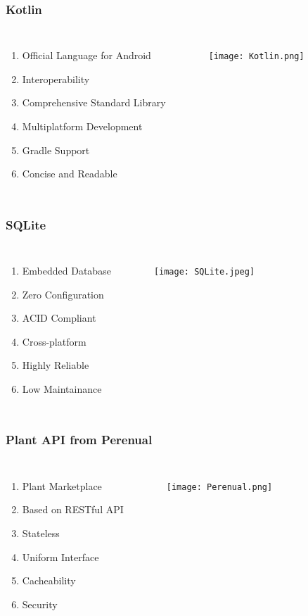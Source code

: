 \documentclass[xcolor=table]{beamer}
\begin{document}
\begin{frame}[fragile]
\frametitle{Kotlin}
\begin{columns}
   \begin{enumerate}
    \item Official Language for Android
    \item Interoperability
    \item Comprehensive Standard Library
    \item Multiplatform Development
    \item Gradle Support
    \item Concise and Readable
  \end{enumerate}
    \begin{figure}[H]
    \texttt{[image: Kotlin.png]}
    \end{figure}
    \end{columns}
\end{frame}

\begin{frame}[fragile]
\frametitle{SQLite}
\begin{columns}
   \begin{enumerate}
    \item Embedded Database
    \item Zero Configuration
    \item ACID Compliant
    \item Cross-platform
    \item Highly Reliable
    \item Low Maintainance
  \end{enumerate}
    \begin{figure}[H]
    \texttt{[image: SQLite.jpeg]}
    \end{figure}
    \end{columns}
\end{frame}

\begin{frame}[fragile]
\frametitle{Plant API from Perenual}
\begin{columns}
   \begin{enumerate}
    \item Plant Marketplace
    \item Based on RESTful API
    \item Stateless
    \item Uniform Interface
    \item Cacheability
    \item Security
  \end{enumerate}
    \begin{figure}[H]
    \texttt{[image: Perenual.png]}
    \end{figure}
    \end{columns}
\end{frame}
\end{document}
